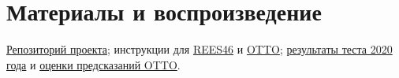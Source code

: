 \documentclass[11pt,a4paper]{article}
\newcommand{\repo}[2]{\href{https://github.com/suprend/tlab-recsys-2026-task1/blob/3f8915dd5979d58709aa9442cdd79b79662dc6d1/#1}{#2}}
\begin{document}
\section{Материалы и воспроизведение} \href{https://github.com/suprend/tlab-recsys-2026-task1}{Репозиторий проекта}; инструкции для \href{https://github.com/suprend/tlab-recsys-2026-task1/blob/main/docs/task1-reproduce.md}{REES46} и \href{https://github.com/suprend/tlab-recsys-2026-task1/blob/main/docs/otto-reproduce.md}{OTTO}; \repo{task1/runs/replication-2020/test.json}{результаты теста 2020 года} и \repo{docs/otto3-run/otto3-kaggle-scores.csv}{оценки предсказаний OTTO}.
\end{document}
